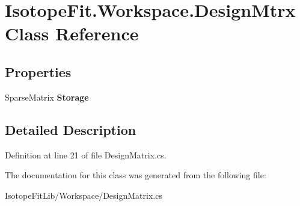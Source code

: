 \hypertarget{class_isotope_fit_1_1_workspace_1_1_design_mtrx}{}\section{Isotope\+Fit.\+Workspace.\+Design\+Mtrx Class Reference}
\label{class_isotope_fit_1_1_workspace_1_1_design_mtrx}
\subsection*{Properties}
\begin{DoxyCompactItemize}
\item 
\mbox{\label{class_isotope_fit_1_1_workspace_1_1_design_mtrx_a3e739d17d113e00d32b5f6b81d35a368}} 
Sparse\+Matrix {\bfseries Storage}
\end{DoxyCompactItemize}


\subsection{Detailed Description}


Definition at line 21 of file Design\+Matrix.\+cs.



The documentation for this class was generated from the following file\+:\begin{DoxyCompactItemize}
\item 
Isotope\+Fit\+Lib/\+Workspace/Design\+Matrix.\+cs\end{DoxyCompactItemize}
